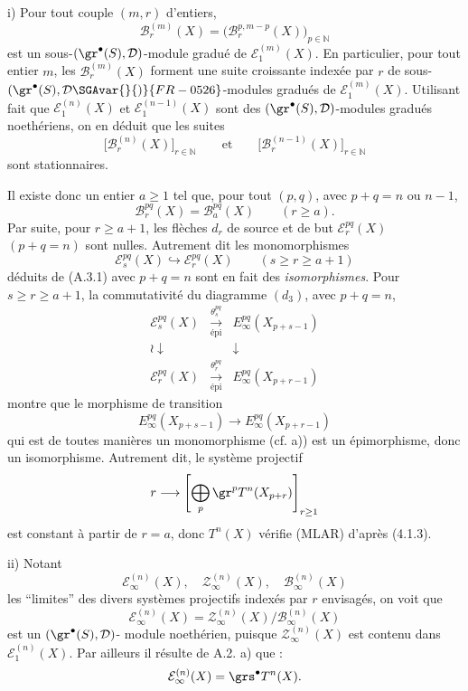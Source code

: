 \begin{prooftext}

i) Pour tout couple \((m,r)\) d'entiers,
\[
\mathcal{B}_r^{(m)}(X)=\bigl(\mathcal{B}_r^{p,m-p}(X)\bigr)_{p\in\mathbb{N}}
\]
est un sous-\((\gr^\bullet(S),\mathcal{D})\)-module gradué de \(\mathcal{E}_1^{(m)}(X)\). En particulier, pour tout entier \(m\), les \(\mathcal{B}_r^{(m)}(X)\) forment une suite croissante indexée par \(r\) de sous-\((\gr^\bullet(S),\mathcal{D}\SGAvar{}{)}{FR-0526}\)-modules gradués de \(\mathcal{E}_1^{(m)}(X)\). Utilisant  fait que \(\mathcal{E}_1^{(n)}(X)\) et \(\mathcal{E}_1^{(n-1)}(X)\) sont des \((\gr^\bullet(S),\mathcal{D})\)-modules gradués noethériens, on en déduit que les suites
\[
\bigl[\mathcal{B}_r^{(n)}(X)\bigr]_{r\in\mathbb{N}}
\qquad\text{et}\qquad
\bigl[\mathcal{B}_r^{(n-1)}(X)\bigr]_{r\in\mathbb{N}}
\]
sont stationnaires.

Il
existe donc un entier \(a\ge1\) tel que, pour tout \((p,q)\), avec \(p+q=n\) ou \(n-1\),
\begin{equation}
\mathcal{B}_r^{pq}(X)=\mathcal{B}_a^{pq}(X)\qquad(r\ge a).
\tag{A.3.1}
\end{equation}
Par suite, pour \(r\ge a+1\), les flèches \(d_r\) de source et de but \(\mathcal{E}_r^{pq}(X)\) \((p+q=n)\) sont nulles. Autrement dit les monomorphismes
\[
\mathcal{E}_s^{pq}(X)\hookrightarrow\mathcal{E}_r^{pq}(X)\qquad(s\ge r\ge a+1)
\]
déduits de (A.3.1) avec \(p+q=n\) sont en fait des \emph{isomorphismes}. Pour \(s\ge r\ge a+1\), la commutativité du diagramme \((d_3)\), avec \(p+q=n\),
\[
\begin{array}{ccc}
\mathcal{E}_s^{pq}(X)&\xrightarrow[\text{épi}]{\theta_s^{pq}}&E_\infty^{pq}(X_{p+s-1})\\
\wr\downarrow&&\downarrow\\
\mathcal{E}_r^{pq}(X)&\xrightarrow[\text{épi}]{\theta_r^{pq}}&E_\infty^{pq}(X_{p+r-1})
\end{array}
\]
montre que le morphisme de transition
\[
E_\infty^{pq}(X_{p+s-1})\longrightarrow E_\infty^{pq}(X_{p+r-1})
\]
qui est de toutes manières un monomorphisme (cf. a)) est un épimorphisme, donc un isomorphisme. Autrement dit, le système projectif
\[
r\longrightarrow\left[\bigoplus_p\gr^p T^n(X_{p+r})\right]_{r\ge1}
\]
est constant à partir de \(r=a\), donc \(T^n(X)\) vérifie (MLAR) d'après (4.1.3).

ii) Notant
\[
\mathcal{E}_\infty^{(n)}(X),\quad
\mathcal{Z}_\infty^{(n)}(X),\quad
\mathcal{B}_\infty^{(n)}(X)
\]
les ``limites'' des divers systèmes projectifs indexés par \(r\) envisagés, on voit que
\[
\mathcal{E}_\infty^{(n)}(X)=
\mathcal{Z}_\infty^{(n)}(X)/\mathcal{B}_\infty^{(n)}(X)
\]
est un \((\gr^\bullet(S),\mathcal{D})\)-
module noethérien, puisque \(\mathcal{Z}_\infty^{(n)}(X)\) est contenu dans \(\mathcal{E}_1^{(n)}(X)\). Par ailleurs il résulte de A.2. a) que :
\[
\mathcal{E}_\infty^{(n)}(X)=\grs^\bullet T^n(X).
\]
\end{prooftext}

